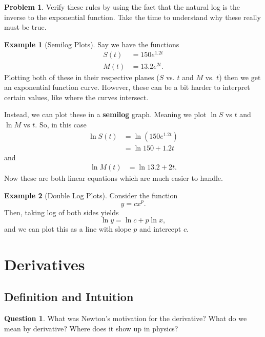 \documentclass[12pt]{article}
\theoremstyle{definition}
\newtheorem{example}{Example}[section]
\newtheorem{problem}{Problem}[section]
\newtheorem{question}{Question}[section]
\begin{document}
\begin{problem}
Verify these rules by using the fact that the natural log is the inverse to the exponential function. Take the time to understand why these really must be true.
\end{problem}

\begin{example}[Semilog Plots]
Say we have the functions
\begin{align*}
    S(t)&=150e^{1.2t}\\
    M(t)&=13.2e^{2t}.
\end{align*}
Plotting both of these in their respective planes ($S$ vs. $t$ and $M$ vs. $t$) then we get an exponential function curve.  However, these can be a bit harder to interpret certain values, like where the curves intersect.

Instead, we can plot these in a \textbf{semilog} graph.  Meaning we plot $\ln S$ vs $t$ and $\ln M$ vs $t$. So, in this case
\begin{align*}
    \ln S(t)&=\ln(150e^{1.2t})\\
    &= \ln 150 + 1.2t
\end{align*}
and
\begin{align*}
    \ln M(t)&=\ln 13.2 + 2t.
\end{align*}
Now these are both linear equations which are much easier to handle.
\end{example}

\begin{example}[Double Log Plots]
Consider the function
\[
y=cx^p.
\]
Then, taking log of both sides yields
\[
\ln y = \ln c + p \ln x,
\]
and we can plot this as a line with slope $p$ and intercept $c$.  
\end{example}

\section{Derivatives}

\subsection{Definition and Intuition}

\begin{question}
What was Newton's motivation for the derivative? What do we mean by derivative? Where does it show up in physics? 
\end{question}
\end{document}
